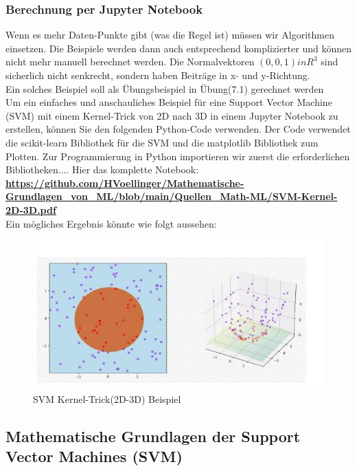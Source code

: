 \documentclass[12pt]{article}
\begin{document}
\subsubsection{Berechnung per Jupyter Notebook}
Wenn es mehr Daten-Punkte gibt (was die Regel ist) müssen wir Algorithmen einsetzen. Die Beispiele werden dann auch entsprechend komplizierter und können nicht mehr manuell berechnet werden. Die Normalvektoren $ (0,0,1)in {R}^3 $ sind sicherlich nicht senkrecht, sondern haben Beiträge in x- und y-Richtung.\\
Ein solches Beispiel soll als Übungsbeispiel in Übung(7.1) gerechnet werden\\[0.3cm]
% 
Um ein einfaches und anschauliches Beispiel für eine Support Vector Machine (SVM) mit einem Kernel-Trick von 2D nach 3D in einem Jupyter Notebook zu erstellen, können Sie den folgenden Python-Code verwenden. Der Code 
verwendet die scikit-learn Bibliothek für die SVM und die matplotlib Bibliothek zum Plotten. Zur Programmierung in Python importieren wir zuerst die erforderlichen Bibliotheken.... Hier das komplette Notebook:\\[0.2cm]
\textbf{\url{https://github.com/HVoellinger/Mathematische-Grundlagen_von_ML/blob/main/Quellen_Math-ML/SVM-Kernel-2D-3D.pdf}}\\
Ein mögliches Ergebnis könnte wie folgt aussehen: \\[0.5cm]
\begin{figure}[htp]
  \centering
  \hspace*{-0.1cm} 
  \includegraphics[width=1.\textwidth]{SVM_Kernel-Trick(2D-3D)_Beispiel}
  \caption{SVM Kernel-Trick(2D-3D) Beispiel}    
  \label{fig:SVM_2D-3D}
\end{figure}

\subsection{Mathematische Grundlagen der Support Vector
Machines (SVM)}
\end{document}
